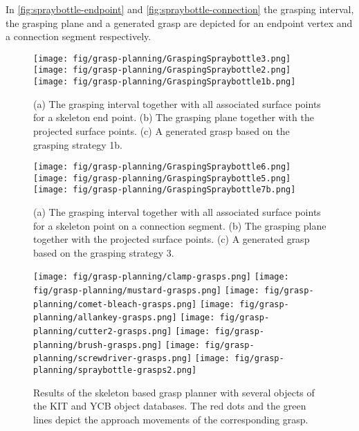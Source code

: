 In \autoref{fig:spraybottle-endpoint} and \autoref{fig:spraybottle-connection} the grasping interval, the grasping plane and a generated grasp are depicted for an endpoint vertex and a connection segment respectively.

\begin{figure}[th!]%
\centering
\texttt{[image: fig/grasp-planning/GraspingSpraybottle3.png]}\hspace{2mm}
\texttt{[image: fig/grasp-planning/GraspingSpraybottle2.png]}\hspace{1mm}
\texttt{[image: fig/grasp-planning/GraspingSpraybottle1b.png]}
\caption{(a) The grasping interval together with all associated surface points for a skeleton end point. (b) The grasping plane together with the projected surface points. (c) A generated grasp based on the grasping strategy 1b.}%
\label{fig:spraybottle-endpoint}%
\end{figure}


\begin{figure}[t!]%
\centering
\texttt{[image: fig/grasp-planning/GraspingSpraybottle6.png]}\hspace{5mm}
\texttt{[image: fig/grasp-planning/GraspingSpraybottle5.png]}
\texttt{[image: fig/grasp-planning/GraspingSpraybottle7b.png]}
\caption{(a) The grasping interval together with all associated surface points for a skeleton point on a connection segment. (b) The grasping plane together with the projected surface points. (c) A generated grasp based on the grasping strategy 3.}%
\label{fig:spraybottle-connection}%
\end{figure}


\begin{figure*}[ht!]%
\centering
\texttt{[image: fig/grasp-planning/clamp-grasps.png]}
\texttt{[image: fig/grasp-planning/mustard-grasps.png]}
\texttt{[image: fig/grasp-planning/comet-bleach-grasps.png]}
\texttt{[image: fig/grasp-planning/allankey-grasps.png]}
\texttt{[image: fig/grasp-planning/cutter2-grasps.png]}
\texttt{[image: fig/grasp-planning/brush-grasps.png]}
\texttt{[image: fig/grasp-planning/screwdriver-grasps.png]}
\texttt{[image: fig/grasp-planning/spraybottle-grasps2.png]}
\caption{Results of the skeleton based grasp planner with several objects of the KIT and YCB object databases. The red dots and the green lines depict the approach movements of the corresponding grasp.}%
\label{fig:results-grasps}%
\end{figure*}

